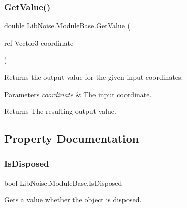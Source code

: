 \subsubsection{\texorpdfstring{Get\+Value()}{GetValue()}\hspace{0.1cm}{\footnotesize\ttfamily [3/3]}}
{\footnotesize\ttfamily double Lib\+Noise.\+Module\+Base.\+Get\+Value (\begin{DoxyParamCaption}\item[{ref Vector3}]{coordinate }\end{DoxyParamCaption})}



Returns the output value for the given input coordinates. 


\begin{DoxyParams}{Parameters}
{\em coordinate} & The input coordinate.\\
\hline
\end{DoxyParams}
\begin{DoxyReturn}{Returns}
The resulting output value.
\end{DoxyReturn}


\subsection{Property Documentation}
\mbox{\label{class_lib_noise_1_1_module_base_adcf3d5aa2957501de0577a6a8317c2d5}} 
\subsubsection{\texorpdfstring{Is\+Disposed}{IsDisposed}}
{\footnotesize\ttfamily bool Lib\+Noise.\+Module\+Base.\+Is\+Disposed\hspace{0.3cm}{\ttfamily [get]}}



Gets a value whether the object is disposed. 

\mbox{\label{class_lib_noise_1_1_module_base_a3f901b6cb96ad011f20f1ce922ff67fc}} 
